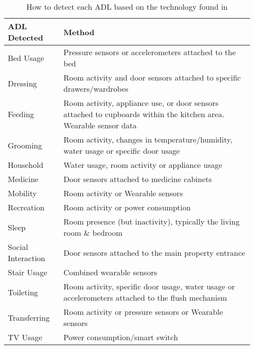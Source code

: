 \begin{table}[!ht]
    \centering
    \caption{How to detect each ADL based on the technology found in \cite{camp_technology_2021}}
    \label{tab:ADL-detection}
    \begin{tabular}[pos]{ p{} p{} }
        \toprule
        \textbf{ADL Detected} & \textbf{Method} \\
        \midrule
        Bed Usage & Pressure sensors or accelerometers attached to the bed \\
        Dressing & Room activity and door sensors attached to specific drawers/wardrobes\\
        Feeding & Room activity, appliance use, or door sensors attached to cupboards within the kitchen area. Wearable sensor data \\
        Grooming & Room activity, changes in temperature/humidity, water usage or specific door usage \\
        Household & Water usage, room activity or appliance usage \\
        Medicine & Door sensors attached to medicine cabinets \\
        Mobility & Room activity or
Wearable sensors \\
        Recreation & Room activity or power consumption\\
        Sleep & Room presence (but inactivity), typically the living room \& bedroom \\
        Social Interaction & Door sensors attached to the main property entrance\\
        Stair Usage & Combined wearable sensors\\ 
        Toileting & Room activity, specific door usage, water usage or accelerometers attached to the flush mechanism\\
        Transferring & Room activity or pressure sensors or
Wearable sensors\\
        TV Usage & Power consumption/smart switch \\
        \bottomrule 
    \end{tabular}
\end{table}

\clearpage
